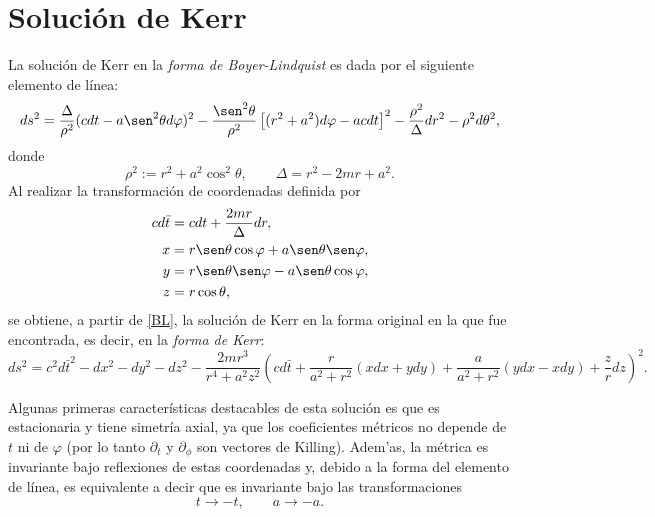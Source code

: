 \section{Soluci\'on de Kerr}
La soluci\'on de Kerr en la \textit{forma de Boyer-Lindquist} es dada por el siguiente elemento de l\'inea:
 \begin{equation}
ds^2=\frac{\Delta}{\rho^2}(cdt-a\sen^2\theta d\varphi)^2-\frac{\sen^2\theta}{\rho^2}\left[(r^2+a^2)d\varphi-acdt \right]^2-\frac{\rho^2}{\Delta}dr^2-\rho^2d\theta^2, \label{BL}
 \end{equation}
donde
\begin{equation}
\rho^2:=r^2+a^2\cos^2\theta,\qquad \Delta=r^2-2mr+a^2.
\end{equation}
Al realizar la transformaci\'on de coordenadas definida por
\begin{equation}
\begin{aligned}
cd\bar{t}&=cdt+\frac{2mr}{\Delta}dr,\\
x&=r\sen\theta\cos\varphi+a\sen\theta\sen\varphi, \\
y&=r\sen\theta\sen\varphi-a\sen\theta\cos\varphi, \\
z&=r\cos\theta,   \label{zrt}
\end{aligned}
\end{equation}
se obtiene, a partir de \eqref{BL}, la soluci\'on de Kerr en la forma original en la que fue encontrada, es decir, en la \textit{forma de Kerr}:
\begin{equation}
ds^2=c^2d\bar{t}^2-dx^2-dy^2-dz^2-\frac{2mr^3}{r^4+a^2z^2}\left(cd\bar{t}+\frac{r}{a^2+r^2}(xdx+ydy)+\frac{a}{a^2+r^2}(ydx-xdy)+\frac{z}{r}dz \right)^2 . \label{Kerr}
\end{equation}

Algunas primeras caracter\'isticas destacables de esta soluci\'on es que es estacionaria y tiene simetr\'ia axial, ya que los coeficientes m\'etricos no depende de $t$ ni de $\varphi$ (por lo tanto $\partial_t$ y $\partial_\phi$ son vectores de Killing). Adem'as, la m\'etrica es invariante bajo reflexiones de estas coordenadas y, debido a la forma del elemento de l\'inea, es equivalente a decir que es invariante bajo las transformaciones
\begin{equation}
t\rightarrow -t, \qquad a\rightarrow -a.
\end{equation}

